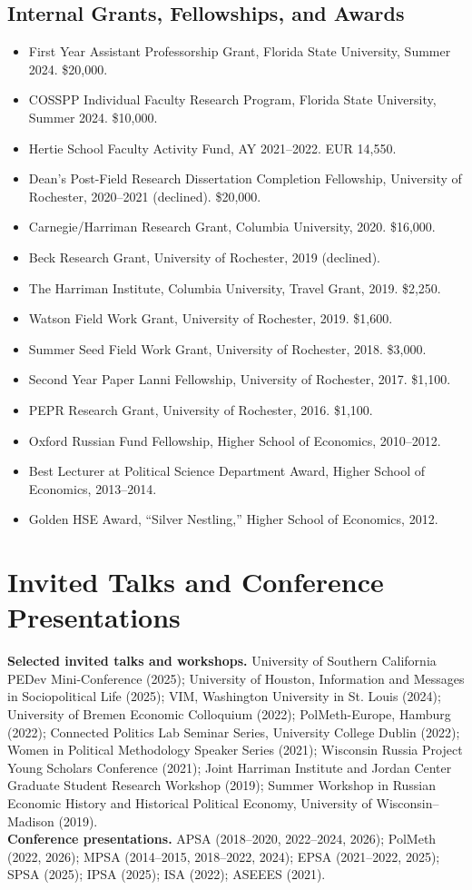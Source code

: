 \documentclass[10pt]{article}
\begin{document}
\subsection{Internal Grants, Fellowships, and Awards}
\begin{itemize}
    \item First Year Assistant Professorship Grant, Florida State University, Summer 2024. \$20,000.
    \item COSSPP Individual Faculty Research Program, Florida State University, Summer 2024. \$10,000.
    \item Hertie School Faculty Activity Fund, AY 2021--2022. EUR 14,550.
    \item Dean's Post-Field Research Dissertation Completion Fellowship, University of Rochester, 2020--2021 (declined). \$20,000.
    \item Carnegie/Harriman Research Grant, Columbia University, 2020. \$16,000.
    \item Beck Research Grant, University of Rochester, 2019 (declined).
    \item The Harriman Institute, Columbia University, Travel Grant, 2019. \$2,250.
    \item Watson Field Work Grant, University of Rochester, 2019. \$1,600.
    \item Summer Seed Field Work Grant, University of Rochester, 2018. \$3,000.
    \item Second Year Paper Lanni Fellowship, University of Rochester, 2017. \$1,100.
    \item PEPR Research Grant, University of Rochester, 2016. \$1,100.
    \item Oxford Russian Fund Fellowship, Higher School of Economics, 2010--2012.
    \item Best Lecturer at Political Science Department Award, Higher School of Economics, 2013--2014.
    \item Golden HSE Award, ``Silver Nestling,'' Higher School of Economics, 2012.
\end{itemize}

\section{Invited Talks and Conference Presentations}
\textbf{Selected invited talks and workshops.} University of Southern California PEDev Mini-Conference (2025); University of Houston, Information and Messages in Sociopolitical Life (2025); VIM, Washington University in St. Louis (2024); University of Bremen Economic Colloquium (2022); PolMeth-Europe, Hamburg (2022); Connected Politics Lab Seminar Series, University College Dublin (2022); Women in Political Methodology Speaker Series (2021); Wisconsin Russia Project Young Scholars Conference (2021); Joint Harriman Institute and Jordan Center Graduate Student Research Workshop (2019); Summer Workshop in Russian Economic History and Historical Political Economy, University of Wisconsin--Madison (2019).\\[3pt]
\textbf{Conference presentations.} APSA (2018--2020, 2022--2024, 2026); PolMeth (2022, 2026); MPSA (2014--2015, 2018--2022, 2024); EPSA (2021--2022, 2025); SPSA (2025); IPSA (2025); ISA (2022); ASEEES (2021).
\end{document}
